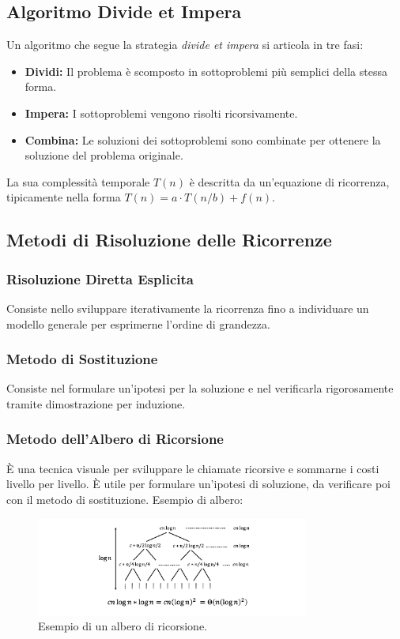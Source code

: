 \subsection{Algoritmo Divide et Impera}
Un algoritmo che segue la strategia \textit{divide et impera} si articola in tre fasi:
\begin{itemize}
    \item \textbf{Dividi:} Il problema è scomposto in sottoproblemi più semplici della stessa forma.
    \item \textbf{Impera:} I sottoproblemi vengono risolti ricorsivamente.
    \item \textbf{Combina:} Le soluzioni dei sottoproblemi sono combinate per ottenere la soluzione del problema originale.
\end{itemize}
La sua complessità temporale $T(n)$ è descritta da un'equazione di ricorrenza, tipicamente nella forma $T(n) = a \cdot T(n/b) + f(n)$.

\subsection{Metodi di Risoluzione delle Ricorrenze}

\subsubsection{Risoluzione Diretta Esplicita}
Consiste nello sviluppare iterativamente la ricorrenza fino a individuare un modello generale per esprimerne l'ordine di grandezza.

\subsubsection{Metodo di Sostituzione}
Consiste nel formulare un'ipotesi per la soluzione e nel verificarla rigorosamente tramite dimostrazione per induzione.

\subsubsection{Metodo dell'Albero di Ricorsione}
È una tecnica visuale per sviluppare le chiamate ricorsive e sommarne i costi livello per livello. È utile per formulare un'ipotesi di soluzione, da verificare poi con il metodo di sostituzione. Esempio di albero:
\begin{figure}[h!]
    \centering
    \includegraphics[width=0.8\textwidth]{images/albero_delle_ricorrenze.png}
    \caption{Esempio di un albero di ricorsione.}
    \label{fig:albero_ricorrenze}
\end{figure}

